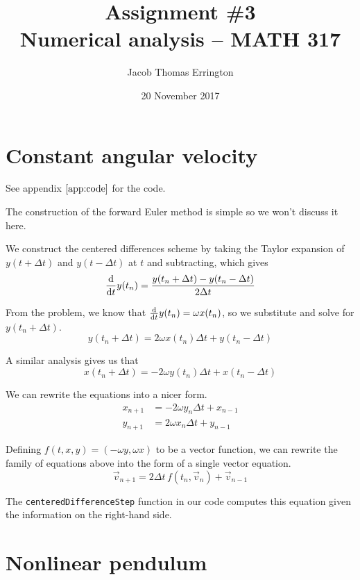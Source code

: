 \documentclass[11pt,letterpaper]{article}
\author{Jacob Thomas Errington}
\title{Assignment \#3\\Numerical analysis -- MATH 317}
\date{20 November 2017}
\begin{document}
\maketitle

\section{Constant angular velocity}

See appendix $\ref{app:code}$ for the code.

The construction of the forward Euler method is simple so we won't discuss it
here.

We construct the centered differences scheme by taking the Taylor expansion of
$y(t + \Delta t)$ and $y(t - \Delta t)$ at $t$ and subtracting, which gives
%
\begin{equation*}
  \frac{\mathrm{d} }{\mathrm{d} t} y(t_n) = \frac{y(t_n + \Delta t) - y(t_n - \Delta t)}{2 \Delta t}
\end{equation*}

From the problem, we know that $\frac{\mathrm{d} }{\mathrm{d} t} y(t_n) = \omega x(t_n)$,
so we substitute and solve for $y(t_n + \Delta t)$.
%
\begin{equation*}
  y(t_n + \Delta t) = 2 \omega x(t_n) \Delta t + y(t_n - \Delta t)
\end{equation*}

A similar analysis gives us that
%
\begin{equation*}
  x(t_n + \Delta t) = -2 \omega y(t_n) \Delta t + x(t_n - \Delta t)
\end{equation*}

We can rewrite the equations into a nicer form.
%
\begin{align*}
  x_{n+1} &= - 2 \omega y_n \Delta t + x_{n-1} \\
  y_{n+1} &= 2 \omega x_n \Delta t + y_{n-1}
\end{align*}

Defining $f(t, x, y) = (-\omega y, \omega x)$ to be a vector function, we can
rewrite the family of equations above into the form of a single vector
equation.
%
\begin{equation*}
  \vec v_{n+1} = 2 \Delta t\, f(t_n, \vec v_n) + \vec v_{n-1}
\end{equation*}

The \texttt{centeredDifferenceStep} function in our code computes this equation
given the information on the right-hand side.

\section{Nonlinear pendulum}
\end{document}
